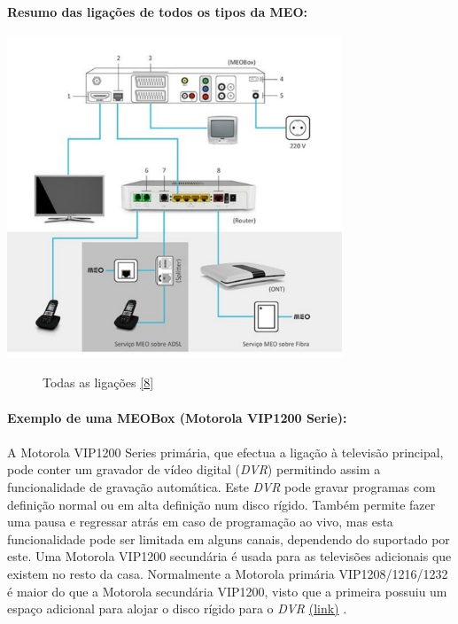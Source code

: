 \documentclass{report}
\begin{document}
\newpage

\paragraph{Resumo das ligações de todos os tipos da MEO:}

\begin{center}
\includegraphics[width=10cm]{Todas_as_ligacoes_(MEO).pdf} 
\begin{figure}[h]
\caption{Todas as ligações \href{https://conteudos.meo.pt/meo/UCMImages/CustomerCare/2013/ESQUEMA-detalhado-todas-ligacoessemlegenda.jpg}{[8]}}
\end{figure}
\end{center}

\paragraph{Exemplo de uma MEOBox (Motorola VIP1200 Serie):}

\paragraph{} A Motorola VIP1200 Series primária, que efectua a ligação à televisão principal, pode conter um gravador de vídeo digital (\textit{DVR}) permitindo assim a funcionalidade de gravação automática. Este \textit{DVR} pode gravar programas com definição normal ou em alta definição num disco rígido. Também permite fazer uma pausa e regressar atrás em caso de programação ao vivo, mas esta funcionalidade pode ser limitada em alguns canais, dependendo do suportado por este. Uma Motorola VIP1200 secundária é usada para as televisões adicionais que existem no resto da casa. Normalmente a Motorola primária VIP1208/1216/1232 é maior do que a Motorola secundária VIP1200, visto que a primeira possuiu um espaço adicional para alojar o disco rígido para o \textit{DVR} \href{https://conteudos.meo.pt/meo/Documentos/Manuais/Box/MEO-Fibra-ADSL/Manual-Instalacao-Motorola.pdf}{(link)} .
\end{document}
